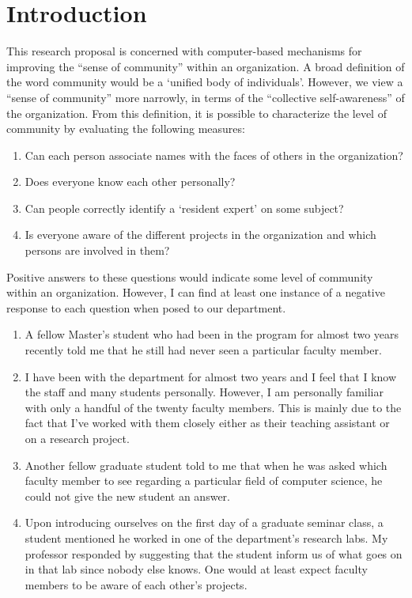 \newpage
\tableofcontents
\newpage

\section{Introduction}


This research proposal is concerned with computer-based mechanisms for
improving the ``sense of community'' within an organization.  A broad
definition of the word community would be a `unified body of individuals'.
However, we view a ``sense of community'' more narrowly, in terms of the
``collective self-awareness'' of the organization.  From this definition,
it is possible to characterize the level of community by evaluating the
following measures:

\begin{enumerate}
\item{Can each person associate names with the faces of others in the
  organization?}
\item{Does everyone know each other personally?}
\item{Can people correctly identify a `resident expert' on some subject?}
\item{Is everyone aware of the different projects in the organization and
  which persons are involved in them?}
\end{enumerate}

Positive answers to these questions would indicate some level of community
within an organization.  However, I can find at least one instance of a
negative response to each question when posed to our department.

\begin{enumerate}
\item{A fellow Master's student who had been in the program for almost two
  years recently told me that he still had never seen a particular faculty
  member.}
\item{I have been with the department for almost two years and I feel that
  I know the staff and many students personally.  However, I am personally
  familiar with only a handful of the twenty faculty members.  This is
  mainly due to the fact that I've worked with them closely either as their
  teaching assistant or on a research project.}
\item{Another fellow graduate student told to me that when he was asked
  which faculty member to see regarding a particular field of computer
  science, he could not give the new student an answer.}
\item{Upon introducing ourselves on the first day of a graduate seminar
  class, a student mentioned he worked in one of the department's research
  labs.  My professor responded by suggesting that the student inform us of
  what goes on in that lab since nobody else knows.  One would at least
  expect faculty members to be aware of each other's projects.}
\end{enumerate}

